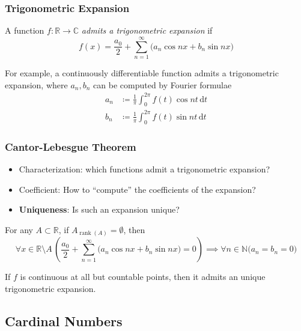 \documentclass[UTF8,aspectratio=43,11pt,colorlinks,compress,openany]{beamer}%
\begin{document}
\begin{frame}\frametitle{Trigonometric Expansion}
	\begin{definition}
	A function $f:\mathbb{R}\to\mathbb{C}$ \emph{admits a trigonometric expansion} if
	\[f(x)=\dfrac{a_0}{2}+\sum\limits_{n=1}^\infty\big(a_n\cos nx+b_n\sin nx\big)\]
	\end{definition}
	For example, a continuously differentiable function admits a trigonometric expansion, where $a_n,b_n$ can be computed by Fourier formulae
	\begin{align*}
	a_n&\coloneqq \frac{1}{\pi}\int_0^{2\pi}\!\!f(t)\cos nt\,\mathrm{d} t\\
	b_n&\coloneqq \frac{1}{\pi}\int_0^{2\pi}\!\!f(t)\sin nt\,\mathrm{d} t
	\end{align*}
\end{frame}

\begin{frame}\frametitle{Cantor-Lebesgue Theorem}
	\begin{itemize}
		\item Characterization: which functions admit a trigonometric expansion?
		\item Coefficient: How to ``compute'' the coefficients of the expansion?
		\item \textbf{Uniqueness}: Is such an expansion unique?
	\end{itemize}
	\begin{theorem}
		For any $A\subset\mathbb{R}$, if $A_{\operatorname{rank}(A)}=\emptyset$, then
		\[\forall x\in\mathbb{R}\!\setminus\!A\,\left(\dfrac{a_0}{2}+\sum\limits_{n=1}^\infty\big(a_n\cos nx+b_n\sin nx\big)=0\right)\implies\forall n\in\mathbb{N}\big(a_n=b_n=0\big)\]
	\end{theorem}
	If $f$ is continuous at all but countable points, then it admits an unique trigonometric expansion.
\end{frame}

\subsection{Cardinal Numbers}
\end{document}
